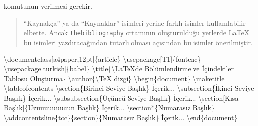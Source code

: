 \documentclass[
  10pt,
]{scrbook}
\newenvironment{Shaded}{\begin{snugshade}}{\end{snugshade}}
\newcommand{\NormalTok}[1]{#1}
\newcommand{\SpecialCharTok}[1]{\textcolor[rgb]{0.00,0.00,0.00}{#1}}
\newcommand{\StringTok}[1]{\textcolor[rgb]{0.31,0.60,0.02}{#1}}
\begin{document}
komutunun verilmesi gerekir.

\begin{quote}
``Kaynakça'' ya da ``Kaynaklar'' isimleri yerine farklı isimler
kullanılabilir elbette. Ancak \texttt{thebibliography} ortamının
oluşturulduğu yerlerde LaTeX bu isimleri yazdıracağından tutarlı
olması açısından bu isimler önerilmiştir.
\end{quote}

\begin{Shaded}
\begin{Highlighting}[]
\NormalTok{\textbackslash{}documentclass[a4paper,12pt]\{article\}}
\NormalTok{\textbackslash{}usepackage[T1]\{fontenc\}}
\NormalTok{\textbackslash{}usepackage[turkish]\{babel\}}
\NormalTok{\textbackslash{}title\{\textbackslash{}LaTeX}\StringTok{\textquotesingle{}de Bölümlendirme  ve İçindekiler Tablosu Oluşturma\}}
\SpecialCharTok{\textbackslash{}a}\StringTok{uthor\{\textbackslash{}TeX dizgi\}}
\SpecialCharTok{\textbackslash{}b}\StringTok{egin\{document\}}
\StringTok{\textbackslash{}maketitle}
\SpecialCharTok{\textbackslash{}t}\StringTok{ableofcontents}
\StringTok{\textbackslash{}section\{Birinci Seviye Başlık\}}
\StringTok{  İçerik...}
\StringTok{\textbackslash{}subsection\{İkinci Seviye Başlık\}}
\StringTok{  İçerik...}
\StringTok{\textbackslash{}subsubsection\{Üçüncü Seviye Başlık\}}
\StringTok{  İçerik...}
\StringTok{\textbackslash{}section[Kısa Başlık]\{Uzuuuuuuuuun Başlık\}}
\StringTok{  İçerik...}
\StringTok{\textbackslash{}section*\{Numarasız Başlık\}}
\SpecialCharTok{\textbackslash{}a}\StringTok{ddcontentsline\{toc\}\{section\}\{Numarasız Başlık\}}
\StringTok{  İçerik...}
\SpecialCharTok{\textbackslash{}e}\StringTok{nd\{document\}}
\end{Highlighting}
\end{Shaded}

\backmatter

  

\printindex
\end{document}
